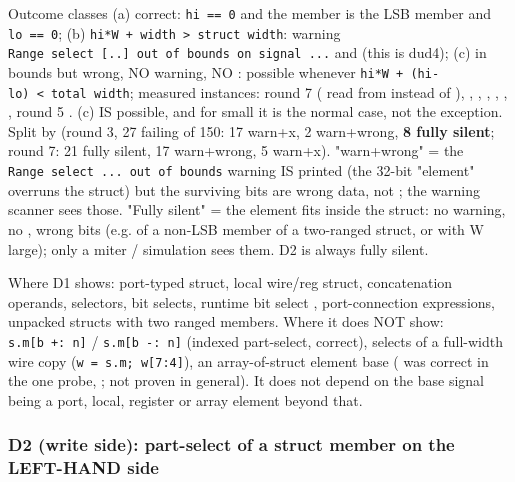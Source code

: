 \begin{record}
Outcome classes (a) correct:
\texttt{hi\ =\allowbreak{}=\allowbreak{}\ 0} and the member is the LSB
member and \texttt{lo\ =\allowbreak{}=\allowbreak{}\ 0}; (b)
\texttt{hi*W\ +\allowbreak{}\ width\ >\ struct\ width}: warning
\texttt{Range\ select\ [.\allowbreak{}.\allowbreak{}]\ out\ of\ bounds\ on\ signal\ .\allowbreak{}.\allowbreak{}.\allowbreak{}}
and  (this is dud4); (c) in bounds but wrong, NO warning, NO
: possible whenever
\texttt{hi*W\ +\allowbreak{}\ (hi-\allowbreak{}lo)\ <\ total\ width};
measured instances: round 7  ( read from
 instead of ), ,
, , ,
, , round 5 . (c) IS possible, and for
small  it is the normal case, not the exception. Split by
 (round 3, 27 failing of 150:
17 warn+x, 2 warn+wrong, \textbf{8 fully silent}; round 7: 21 fully
silent, 17 warn+wrong, 5 warn+x). "warn+wrong" = the
\texttt{Range\ select\ .\allowbreak{}.\allowbreak{}.\allowbreak{}\ out\ of\ bounds}
warning IS printed (the 32-bit "element" overruns the struct) but the
surviving bits are wrong data, not ; the  warning
scanner sees those. "Fully silent" = the element fits inside the struct:
no warning, no , wrong bits (e.g.  of a non-LSB
member of a two-ranged struct, or  with W large); only a
miter / simulation sees them. D2 is always fully silent.

Where D1 shows: port-typed struct, local wire/reg struct, concatenation
operands,  selectors, bit selects, runtime bit select
, port-connection expressions, unpacked structs with two
ranged members. Where it does NOT show:
\texttt{s.\allowbreak{}m[b\ +\allowbreak{}:\allowbreak{}\ n]} /
\texttt{s.\allowbreak{}m[b\ -\allowbreak{}:\allowbreak{}\ n]} (indexed
part-select, correct), selects of a full-width wire copy
(\texttt{w\ =\allowbreak{}\ s.\allowbreak{}m;\ w[7:\allowbreak{}4]}), an
array-of-struct element base ( was correct in the
one probe, ; not proven in general). It does not depend
on the base signal being a port, local, register or array element beyond
that.

\end{record}

\subsubsection{D2 (write side): part-select of a struct member on the
LEFT-HAND side}\label{cr:defect:synlig-struct-select-ainf:d2-write-side-part-select-of-a-struct-member-on-the-left-hand-side}

